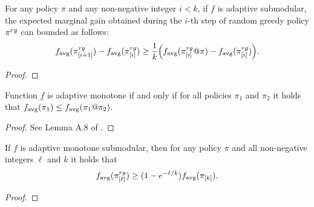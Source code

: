 \begin{lemma}
  For any policy $\pi$ and any non-negative integer $i < k$, if $f$ is adaptive submodular, the expected marginal gain obtained during the $i$-th step of random greedy policy $\pi^{rg}$ can bounded as follows:
  \begin{align*}
    \favg(\pigii) - \favg(\pigi) \geq \frac{1}{k}\left(\favg(\pigi @ \pi) - \favg(\pigi)\right).
  \end{align*}
\end{lemma}
\begin{proof}
\todo{}
\end{proof}

\begin{lemma}
  Function $f$ is adaptive monotone if and only if for all policies $\pi_1$ and $\pi_2$ it holds that $f_{\mathrm{avg}}(\pi_1) \leq f_{\mathrm{avg}}(\pi_1 @ \pi_2)$.
\end{lemma}
\begin{proof}
See Lemma A.8 of \citet{golovin11}.
\end{proof}

\begin{theorem}
  If $f$ is adaptive monotone submodular, then for any policy $\pi$ and all non-negative integers $\ell$ and $k$ it holds that
  \begin{align*}
    f_{\mathrm{avg}}(\pi^{rg}_{[\ell]}) \geq (1 - e^{-\ell/k})f_{\mathrm{avg}}(\pi_{[k]}).
  \end{align*}
\end{theorem}
\begin{proof}
\todo{}
\end{proof}